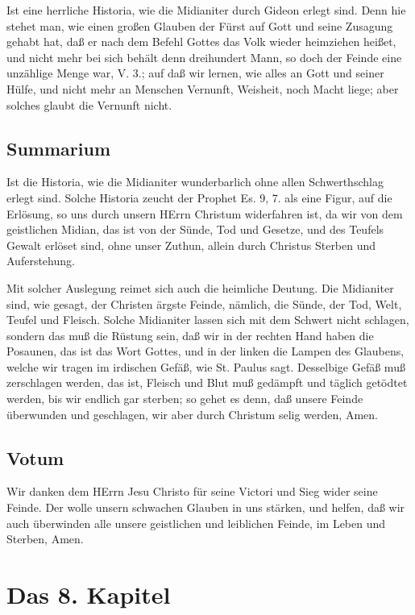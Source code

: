 Ist eine herrliche Historia, wie die Midianiter durch Gideon erlegt sind. Denn hie stehet man,
wie einen großen Glauben der Fürst auf Gott und seine Zusagung gehabt hat, daß er nach dem Befehl Gottes das Volk wieder heimziehen heißet, und nicht mehr bei sich behält denn dreihundert Mann, so doch der Feinde eine unzählige Menge war, V. 3.; auf daß wir lernen, wie alles an Gott und seiner Hülfe, und nicht mehr an Menschen Vernunft, Weisheit, noch Macht liege; aber solches glaubt die Vernunft nicht.

\section{Summarium}

Ist die Historia, wie die Midianiter wunderbarlich ohne allen Schwerthschlag erlegt sind. Solche Historia zeucht der Prophet Es. 9, 7. als eine Figur, auf die Erlösung, so uns durch unsern HErrn Christum widerfahren ist, da wir von dem geistlichen Midian, das ist von der Sünde, Tod und Gesetze, und des Teufels Gewalt erlöset sind, ohne unser Zuthun, allein durch Christus Sterben und Auferstehung.

Mit solcher Auslegung reimet sich auch die heimliche Deutung. Die Midianiter sind, wie gesagt, der Christen ärgste Feinde, nämlich, die Sünde, der Tod, Welt, Teufel und Fleisch. Solche Midianiter lassen sich mit dem Schwert nicht schlagen, sondern das muß die Rüstung sein, daß wir in der rechten Hand haben die Posaunen, das ist das Wort Gottes, und in der linken die Lampen des Glaubens, welche wir tragen im irdischen Gefäß, wie St. Paulus sagt. Desselbige Gefäß muß zerschlagen werden, das ist, Fleisch und Blut muß gedämpft und täglich getödtet werden, bis wir endlich gar sterben; so gehet es denn, daß unsere Feinde überwunden und geschlagen, wir aber durch Christum selig werden, Amen.

\section{Votum}

Wir danken dem HErrn Jesu Christo für seine Victori und Sieg wider seine Feinde. Der wolle unsern schwachen Glauben in uns stärken, und helfen, daß wir auch überwinden alle unsere geistlichen und leiblichen Feinde, im Leben und Sterben, Amen.

\chapter{Das 8. Kapitel}

